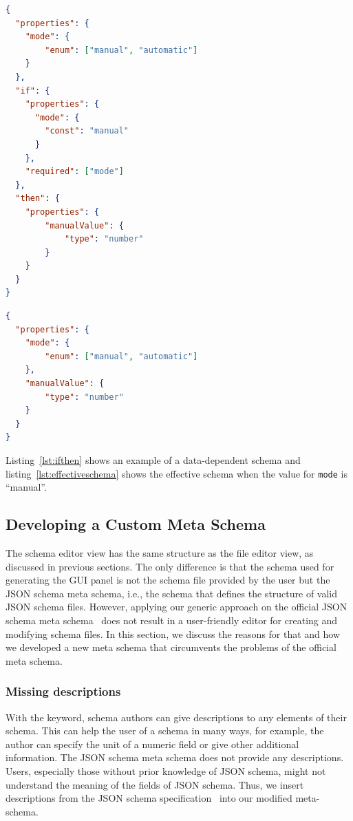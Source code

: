 \begin{lstlisting}[language=json, firstnumber=1, caption=
    {Data dependent schema. If the field \texttt{mode} is set to ``manual'' in the data, users will expect that the GUI shows the \texttt{manualValue} property}, captionpos=b, label={lst:ifthen}]
{
  "properties": {
    "mode": {
        "enum": ["manual", "automatic"]
    }
  },
  "if": {
    "properties": {
      "mode": {
        "const": "manual"
      }
    },
    "required": ["mode"]
  },
  "then": {
    "properties": {
        "manualValue": {
            "type": "number"
        }
    }
  }
}
\end{lstlisting}
\begin{lstlisting}[language=json, firstnumber=1, caption=
    {Effective schema when the value for \texttt{mode} is ``manual''}, captionpos=b, label={lst:effectiveschema}]
{
  "properties": {
    "mode": {
        "enum": ["manual", "automatic"]
    },
    "manualValue": {
        "type": "number"
    }
  }
}
\end{lstlisting}

Listing~\ref{lst:ifthen} shows an example of a data-dependent schema and listing~\ref{lst:effectiveschema} shows
the effective schema when the value for \texttt{mode} is ``manual''.

\subsection{Developing a Custom Meta Schema}\label{subsec:schema-editor}

The schema editor view has the same structure as the file editor view, as discussed in previous sections.
The only difference is that the schema used for generating the GUI panel is not the schema file provided by the user but the JSON schema meta schema,
i.e., the schema that defines the structure of valid JSON schema files.
However, applying our generic approach on the official JSON schema meta schema~\cite{jsonschemaJSONSchema} does not result in a user-friendly editor for
creating and modifying schema files.
In this section, we discuss the reasons for that and how we developed a new meta schema that circumvents the problems of the official meta schema.

\subsubsection{Missing descriptions}
With the  keyword, schema authors can give descriptions to any elements of their schema.
This can help the user of a schema in many ways, for example, the author can specify the unit of a numeric field or give other additional information.
The JSON schema meta schema does not provide any descriptions.
Users, especially those without prior knowledge of JSON schema, might not understand the meaning of the fields of JSON schema.
Thus, we insert descriptions from the JSON schema specification~\cite{jsonschemaJSONSchema} into our modified meta-schema.

